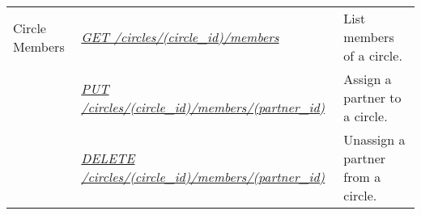 \documentclass[letterpaper,10pt,english]{sphinxmanual}
\begin{document}
\noindent\begin{tabulary}{\linewidth}{|L|L|L|}
\hline
{}\relax &\relax &\relax \\
\hline
Circle Members
&
{\hyperref[\detokenize{resources/circle:get--circles-(circle_id)-members}]{\emph{GET /circles/(circle\_id)/members}}}
&
List members of a circle.
\\
\hline&
{\hyperref[\detokenize{resources/circle:put--circles-(circle_id)-members-(partner_id)}]{\emph{PUT /circles/(circle\_id)/members/(partner\_id)}}}
&
Assign a partner to a circle.
\\
\hline&
{\hyperref[\detokenize{resources/circle:delete--circles-(circle_id)-members-(partner_id)}]{\emph{DELETE /circles/(circle\_id)/members/(partner\_id)}}}
&
Unassign a partner from a circle.
\\
\hline\end{tabulary}


\begin{DUlineblock}{0em}
\item[] 
\end{DUlineblock}
\end{document}
